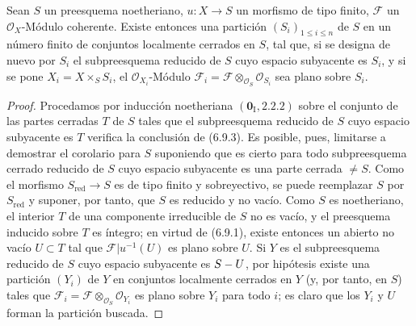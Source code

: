 \begin{corollary}[6.9.3]
\label{IV.2.s6.9.3-fr}
Sean $S$ un preesquema noetheriano, $u:X\to S$ un morfismo de tipo finito,
$\mathcal F$ un $\mathcal O_X$-Módulo coherente. Existe entonces una partición
$(S_i)_{1\leq i\leq n}$ de $S$ en un número finito de conjuntos localmente cerrados
en $S$, tal que, si se designa de nuevo por $S_i$ el subpreesquema reducido
de $S$ cuyo espacio subyacente es $S_i$, y si se pone
$X_i=X\times_S S_i$, el $\mathcal O_{X_i}$-Módulo
$\mathcal F_i=\mathcal F\otimes_{\mathcal O_S}\mathcal O_{S_i}$ sea plano
sobre $S_i$.
\end{corollary}

\begin{proof}
Procedamos por inducción noetheriana $(\mathbf{0}_{\mathrm I},2.2.2)$ sobre el conjunto
de las partes cerradas $T$ de $S$ tales que el subpreesquema reducido de $S$
cuyo espacio subyacente es $T$ verifica la conclusión de (6.9.3). Es posible,
pues, limitarse a demostrar el corolario para $S$ suponiendo que es cierto
para todo subpreesquema cerrado reducido de $S$ cuyo espacio subyacente es una
parte cerrada $\ne S$. Como el morfismo $S_{\mathrm{red}}\to S$ es de tipo
finito y sobreyectivo, se puede reemplazar $S$ por $S_{\mathrm{red}}$ y suponer,
por tanto, que $S$ es reducido y no vacío. Como $S$ es noetheriano, el interior $T$ de una
componente irreducible de $S$ no es vacío, y el preesquema inducido sobre $T$
es íntegro; en virtud de (6.9.1), existe entonces un abierto no vacío $U\subset T$
tal que $\mathcal F|u^{-1}(U)$ es plano sobre $U$. Si $Y$ es el
subpreesquema reducido de $S$ cuyo espacio subyacente es $S- U$, por
hipótesis existe una partición $(Y_i)$ de $Y$ en conjuntos localmente cerrados en
$Y$ (y, por tanto, en $S$) tales que
$\mathcal F_i=\mathcal F\otimes_{\mathcal O_S}\mathcal O_{Y_i}$ es plano
sobre $Y_i$ para todo $i$; es claro que los $Y_i$ y $U$ forman la
partición buscada.
\end{proof}
